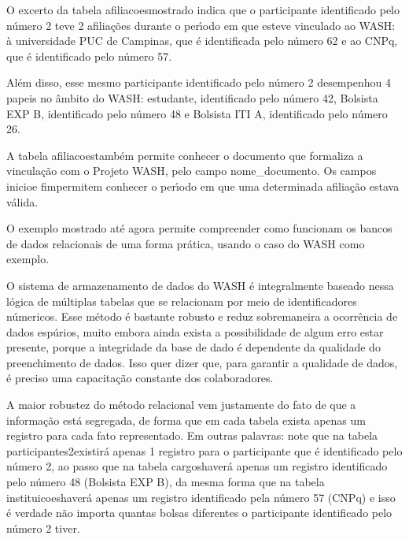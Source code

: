 \documentclass[
12pt,		%
openright,	%
twoside,  %
a4paper,			%
chapter=TITLE,		%
english,			%
french,				%
spanish,			%
brazil				%
]{USPSC-classe/USPSC_RedarTex}
\begin{document}
O excerto da tabela \textquotedbl afiliacoes\textquotedbl  mostrado indica que o participante identificado pelo n\'umero 2 teve 2 afilia\c{c}\~oes durante o per\'{\i}odo em que esteve vinculado ao WASH: \`a universidade PUC de Campinas, que \'e identificada pelo n\'umero 62 e ao CNPq, que \'e identificado pelo n\'umero 57.








Al\'em disso, esse mesmo participante identificado pelo n\'umero 2 desempenhou 4 papeis no \^ambito do WASH: estudante, identificado pelo n\'umero 42, Bolsista EXP B, identificado pelo n\'umero 48 e Bolsista ITI A, identificado pelo n\'umero 26.








A tabela \textquotedbl afiliacoes\textquotedbl  tamb\'em permite conhecer o documento que formaliza a vincula\c{c}\~ao com o Projeto WASH, pelo campo nome\_documento. Os campos \textquotedbl inicio\textquotedbl  e \textquotedbl fim\textquotedbl  permitem conhecer o per\'{\i}odo em que uma determinada afilia\c{c}\~ao estava v\'alida.








O exemplo mostrado at\'e agora permite compreender como funcionam os bancos de dados relacionais de uma forma pr\'atica, usando o caso do WASH como exemplo.








O sistema de armazenamento de dados do WASH \'e integralmente baseado nessa l\'ogica de m\'ultiplas tabelas que se relacionam por meio de identificadores n\'umericos. Esse m\'etodo \'e bastante robusto e reduz sobremaneira a ocorr\^encia de dados esp\'urios, muito embora ainda exista a possibilidade de algum erro estar presente, porque a integridade da base de dado \'e dependente da qualidade do preenchimento de dados. Isso quer dizer que, para garantir a qualidade de dados, \'e preciso uma capacita\c{c}\~ao constante dos colaboradores.








A maior robustez do m\'etodo relacional vem justamente do fato de que a informa\c{c}\~ao est\'a segregada, de forma que em cada tabela exista apenas um registro para cada fato representado. Em outras palavras: note que na tabela \textquotedbl participantes2\textquotedbl  existir\'a apenas 1 registro para o participante que \'e identificado pelo n\'umero 2, ao passo que na tabela \textquotedbl cargos\textquotedbl  haver\'a apenas um registro identificado pelo n\'umero 48 (Bolsista EXP B), da mesma forma que na tabela \textquotedbl instituicoes\textquotedbl  haver\'a apenas um registro identificado pela n\'umero 57 (CNPq) e isso \'e verdade n\~ao importa quantas bolsas diferentes o participante identificado pelo n\'umero 2 tiver.
\end{document}
